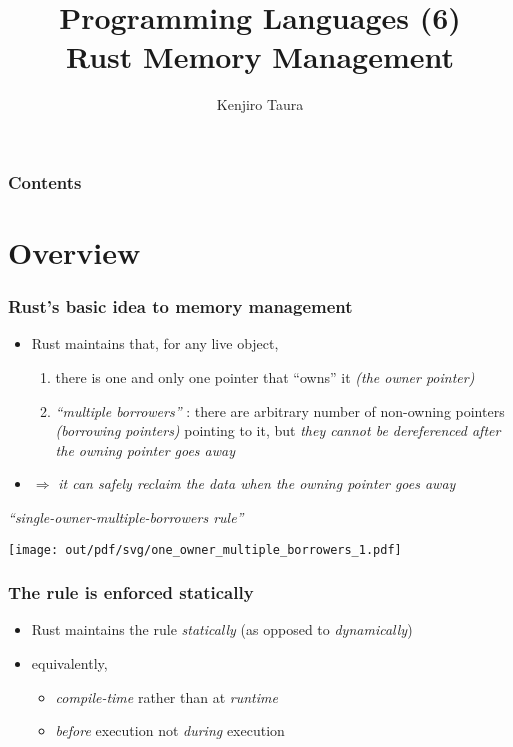 \documentclass[12pt,dvipdfmx]{beamer}
\title{Programming Languages (6) \\
  Rust Memory Management}
\institute{}
\author{Kenjiro Taura}
\date{}
\newcommand{\mura}[1]{{\color{purple}#1}}
\newcommand{\ao}[1]{{\color{blue}#1}}
\newcommand{\aka}[1]{{\color{red}#1}}
\newcommand{\therustrule}{single-owner-multiple-borrowers}
\begin{document}
\maketitle

\begin{frame}
\frametitle{Contents}
\tableofcontents
\end{frame}

\section{Overview}
\begin{frame}
  \frametitle{Rust's basic idea to memory management}
  \begin{itemize}
  \item Rust maintains that, for any live object, 
    \begin{enumerate}
    \item there is one and only one pointer that ``owns'' it
      \mura{\it (the owner pointer)}
    \item \ao{\it ``multiple borrowers''} :
      there are arbitrary number of non-owning pointers
      \ao{\it (borrowing pointers)}
      pointing to it,
      but {\it they cannot be dereferenced after the owning pointer goes away}
    \end{enumerate}
  \item $\Rightarrow$
    {\it it can safely reclaim the data when the owning pointer goes away}
  \end{itemize}
  \begin{center}
    {\large\it ``{\it \therustrule} rule''}

    \texttt{[image: out/pdf/svg/one\_owner\_multiple\_borrowers\_1.pdf]}
  \end{center}
\end{frame}

\begin{frame}
  \frametitle{The rule is enforced statically}
  \begin{itemize}
  \item Rust maintains the rule \ao{\it statically}
    (as opposed to \aka{\it dynamically})
  \item equivalently,
    \begin{itemize}
    \item \ao{\it compile-time} rather than at \aka{\it runtime}
    \item \ao{\it before} execution not \aka{\it during} execution
    \end{itemize}
  \end{itemize}
\end{frame}
\end{document}
